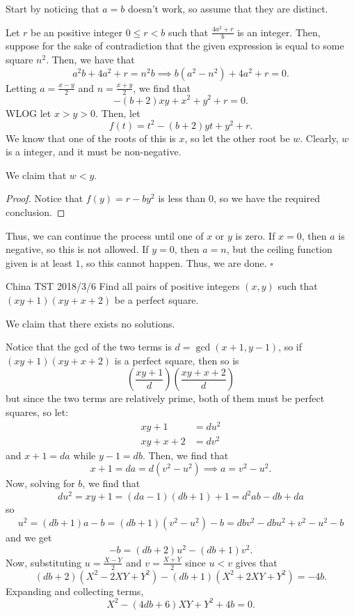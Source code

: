\documentclass{article}
\begin{document}
Start by noticing that $a = b$ doesn't work, so assume that they are distinct.

Let $r$ be an positive integer $0 \le r < b$ such that $\tfrac{4a^2+r}{b}$ is an integer. Then, suppose for the sake of contradiction that the given expression is equal to some square $n^2$. Then, we have that \[a^2b+4a^2+r = n^2b \implies b(a^2-n^2)+4a^2+r = 0.\] Letting $a = \tfrac{x-y}{2}$ and $n = \tfrac{x+y}{2}$, we find that \[-(b+2)xy+x^2+y^2+r = 0.\] WLOG let $x > y > 0$. Then, let \[f(t) = t^2-(b+2)yt+y^2+r.\] We know that one of the roots of this is $x$, so let the other root be $w$. Clearly, $w$ is a integer, and it must be non-negative.

\begin{claim*}
We claim that $w < y$.
\end{claim*}
\begin{proof}
Notice that $f(y) = r-by^2$ is less than $0$, so we have the required conclusion.
\end{proof}

Thus, we can continue the process until one of $x$ or $y$ is zero. If $x = 0$, then $a$ is negative, so this is not allowed. If $y = 0$, then $a = n$, but the ceiling function given is at least $1$, so this cannot happen. Thus, we are done. $\square$

\begin{problem}[4.9.20]{China TST 2018/3/6}
Find all pairs of positive integers $(x, y)$ such that $(xy + 1)(xy + x + 2)$ be a perfect square.
\end{problem}

We claim that there exists no solutions.

Notice that the gcd of the two terms is $d = \gcd(x+1, y-1)$, so if $(xy+1)(xy+x+2)$ is a perfect square, then so is \[\left(\dfrac{xy+1}{d}\right)\left(\dfrac{xy+x+2}{d}\right)\] but since the two terms are relatively prime, both of them must be perfect squares, so let:
\begin{align*}
xy+1 &= du^2 \\
xy+x+2 &= dv^2
\end{align*}
and $x+1 = da$ while $y-1 = db$. Then, we find that \[x+1 = da = d(v^2-u^2) \implies a = v^2-u^2.\] Now, solving for $b$, we find that \[du^2 = xy+1 = (da-1)(db+1)+1 = d^2ab-db+da\] so \[u^2 = (db+1)a-b = (db+1)(v^2-u^2)-b = dbv^2-dbu^2+v^2-u^2-b\] and we get \[-b = (db+2)u^2-(db+1)v^2.\] Now, substituting $u = \tfrac{X-Y}{2}$ and $v = \tfrac{X+Y}{2}$ since $u < v$ gives that \[(db+2)(X^2-2XY+Y^2)-(db+1)(X^2+2XY+Y^2) = -4b.\] Expanding and collecting terms, \[X^2-(4db+6)XY+Y^2+4b = 0.\] 
\end{document}
